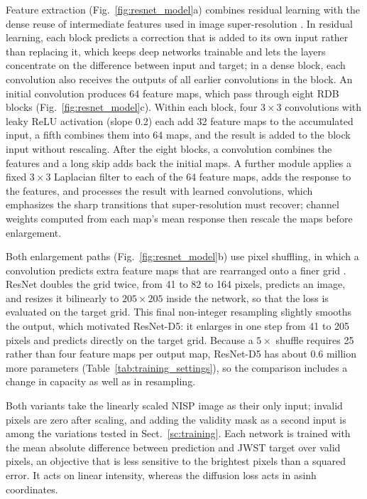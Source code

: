 \documentclass[longauth]{aa}
\begin{document}
Feature extraction (Fig.~\ref{fig:resnet_model}a) combines residual learning \citep{ResNet} with the dense reuse of intermediate features used in image super-resolution \citep{Zhang2018RDN, Wang2018}.
In residual learning, each block predicts a correction that is added to its own input rather than replacing it, which keeps deep networks trainable and lets the layers concentrate on the difference between input and target; in a dense block, each convolution also receives the outputs of all earlier convolutions in the block.
An initial convolution produces 64 feature maps, which pass through eight RDB blocks (Fig.~\ref{fig:resnet_model}c).
Within each block, four $3\times3$ convolutions with leaky ReLU activation (slope 0.2) each add 32 feature maps to the accumulated input, a fifth combines them into 64 maps, and the result is added to the block input without rescaling.
After the eight blocks, a convolution combines the features and a long skip adds back the initial maps. 
A further module applies a fixed $3\times3$ Laplacian filter to each of the 64 feature maps, adds the response to the features, and processes the result with learned convolutions, which emphasizes the sharp transitions that super-resolution must recover; channel weights computed from each map's mean response \citep{hu2019} then rescale the maps before enlargement.

Both enlargement paths (Fig.~\ref{fig:resnet_model}b) use pixel shuffling, in which a convolution predicts extra feature maps that are rearranged onto a finer grid \citep{Shi2016PixelShuffle}.
ResNet doubles the grid twice, from 41 to 82 to 164 pixels, predicts an image, and resizes it bilinearly to $205\times205$ inside the network, so that the loss is evaluated on the target grid.
This final non-integer resampling slightly smooths the output, which motivated ResNet-D5: it enlarges in one step from 41 to 205 pixels and predicts directly on the target grid.
Because a $5\times$ shuffle requires 25 rather than four feature maps per output map, ResNet-D5 has about 0.6 million more parameters (Table~\ref{tab:training_settings}), so the comparison includes a change in capacity as well as in resampling.

Both variants take the linearly scaled NISP image as their only input; invalid pixels are zero after scaling, and adding the validity mask as a second input is among the variations tested in Sect.~\ref{sc:training}.
Each network is trained with the mean absolute difference between prediction and JWST target over valid pixels, an objective that is less sensitive to the brightest pixels than a squared error.
It acts on linear intensity, whereas the diffusion loss acts in asinh coordinates.
\end{document}
